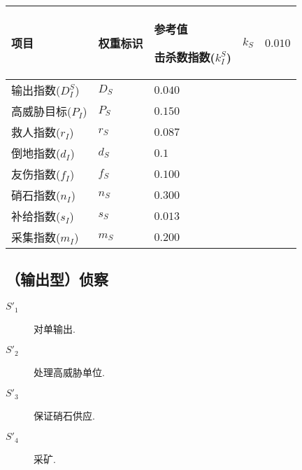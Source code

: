 \documentclass{ctexart}
\begin{document}
\begin{longtable}{|>{\centering\arraybackslash}p{8em}|>{\centering\arraybackslash}p{4em}|>{\centering\arraybackslash}p{6em}|}
    \hline

    项目             & 权重标识  & 参考值     \endhead

    \hline

    击杀数指数($k_I^S$) & $k_S$ & $0.010$          \\

    \hline

    输出指数($D_I^S$)  & $D_S$ & $0.040$          \\

    \hline

    高威胁目标($P_I$)   & $P_S$ & $0.150$          \\

    \hline

    救人指数($r_I$)    & $r_S$ & $0.087$          \\

    \hline

    倒地指数($d_I$)    & $d_S$ & $0.1$          \\

    \hline

    友伤指数($f_I$)    & $f_S$ & $0.100$          \\

    \hline

    硝石指数($n_I$)    & $n_S$ & $0.300$          \\

    \hline

    补给指数($s_I$)    & $s_S$ & $0.013$          \\

    \hline

    采集指数($m_I$)    & $m_S$ & $0.200$          \\

    \hline
\end{longtable}


\subsection{（输出型）侦察}

\begin{description}
    \item[$S'_1$] 对单输出.
    \item[$S'_2$] 处理高威胁单位.
    \item[$S'_3$] 保证硝石供应.
    \item[$S'_4$] 采矿.
\end{description}
\end{document}
